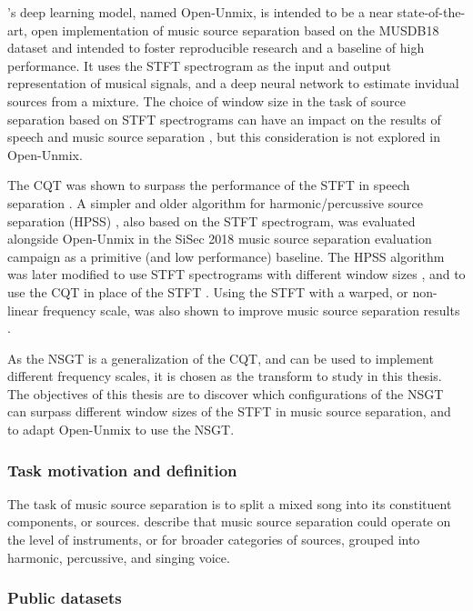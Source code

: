 \documentclass[report.tex]{subfiles}
\begin{document}
\textcite{umx}'s deep learning model, named Open-Unmix, is intended to be a near state-of-the-art, open implementation of music source separation based on the MUSDB18 dataset \cite{musdb18} and intended to foster reproducible research and a baseline of high performance. It uses the STFT spectrogram as the input and output representation of musical signals, and a deep neural network to estimate invidual sources from a mixture. The choice of window size in the task of source separation based on STFT spectrograms can have an impact on the results of speech and music source separation \cite{musicsepwindow}, but this consideration is not explored in Open-Unmix.

The CQT was shown to surpass the performance of the STFT in speech separation \cite{cqtseparation}. A simpler and older algorithm for harmonic/percussive source separation (HPSS) \cite{fitzgerald1}, also based on the STFT spectrogram, was evaluated alongside Open-Unmix in the SiSec 2018 music source separation evaluation campaign \cite{sisec2018} as a primitive (and low performance) baseline. The HPSS algorithm was later modified to use STFT spectrograms with different window sizes \cite{driedger, fitzgerald2}, and to use the CQT in place of the STFT \cite{fitzgerald2}. Using the STFT with a warped, or non-linear frequency scale, was also shown to improve music source separation results \cite{bettermusicsep}.

As the NSGT is a generalization of the CQT, and can be used to implement different frequency scales, it is chosen as the transform to study in this thesis. The objectives of this thesis are to discover which configurations of the NSGT can surpass different window sizes of the STFT in music source separation, and to adapt Open-Unmix to use the NSGT.


\subsubsection{Task motivation and definition}


The task of music source separation is to split a mixed song into its constituent components, or sources. \textcite{musicsepgood} describe that music source separation could operate on the level of instruments, or for broader categories of sources, grouped into harmonic, percussive, and singing voice.

\subsubsection{Public datasets}
\end{document}
